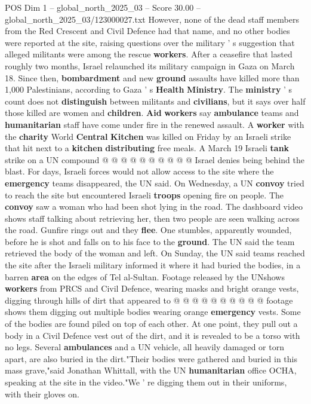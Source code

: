 \begin{textsample}{POS Dim 1 – global\_north\_2025\_03 – Score 30.00 – global\_north\_2025\_03/123000027.txt}
However, none of the dead staff members from the Red Crescent and Civil Defence had that name, and no other bodies were reported at the site, raising questions over the military ' s suggestion that alleged militants were among the rescue \textbf{workers}.
After a ceasefire that lasted roughly two months, Israel relaunched its military campaign in Gaza on March 18.
Since then, \textbf{bombardment} and new \textbf{ground} assaults have killed more than 1,000 Palestinians, according to Gaza ' s \textbf{Health} \textbf{Ministry}.
The \textbf{ministry} ' s count does not \textbf{distinguish} between militants and \textbf{civilians}, but it says over half those killed are women and \textbf{children}. \textbf{Aid} \textbf{workers} say \textbf{ambulance} teams and \textbf{humanitarian} staff have come under fire in the renewed assault.
A \textbf{worker} with the \textbf{charity} World \textbf{Central} \textbf{Kitchen} was killed on Friday by an Israeli strike that hit next to a \textbf{kitchen} \textbf{distributing} free meals.
A March 19 Israeli \textbf{tank} strike on a UN compound @ @ @ @ @ @ @ @ @ @ Israel denies being behind the blast.
For days, Israeli forces would not allow access to the site where the \textbf{emergency} teams disappeared, the UN said.
On Wednesday, a UN \textbf{convoy} tried to reach the site but encountered Israeli \textbf{troops} opening fire on people.
The \textbf{convoy} saw a woman who had been shot lying in the road.
The dashboard video shows staff talking about retrieving her, then two people are seen walking across the road.
Gunfire rings out and they \textbf{flee}.
One stumbles, apparently wounded, before he is shot and falls on to his face to the \textbf{ground}.
The UN said the team retrieved the body of the woman and left.
On Sunday, the UN said teams reached the site after the Israeli military informed it where it had buried the bodies, in a barren \textbf{area} on the edges of Tel al-Sultan.
Footage released by the UNshows \textbf{workers} from PRCS and Civil Defence, wearing masks and bright orange vests, digging through hills of dirt that appeared to @ @ @ @ @ @ @ @ @ @ footage shows them digging out multiple bodies wearing orange \textbf{emergency} vests.
Some of the bodies are found piled on top of each other.
At one point, they pull out a body in a Civil Defence vest out of the dirt, and it is revealed to be a torso with no legs.
Several \textbf{ambulances} and a UN vehicle, all heavily damaged or torn apart, are also buried in the dirt."Their bodies were gathered and buried in this mass grave,"said Jonathan Whittall, with the UN \textbf{humanitarian} office OCHA, speaking at the site in the video."We ' re digging them out in their uniforms, with their gloves on.

\end{textsample}
